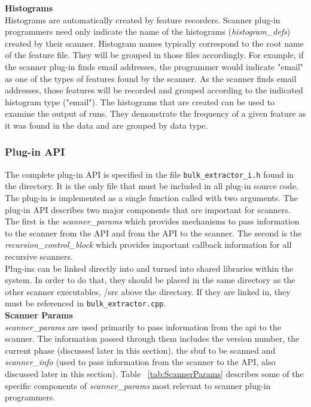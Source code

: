 \documentclass[11pt,fleqn]{article} %
\begin{document}
\textbf{Histograms} \\
Histograms are automatically created by feature recorders. Scanner plug-in programmers need only indicate the name of the histograms (\textit{histogram\_defs}) created by their scanner. Histogram names typically correspond to the root name of the feature file.  They will be grouped in those files accordingly. For example, if the scanner plug-in finds email addresses, the programmer would indicate "email" as one of the types of features found by the scanner. As the scanner finds email addresses, those features will be recorded and grouped according to the indicated histogram type ("email"). The histograms that are created can be used to examine the output of \bulk runs.  They demonstrate the frequency of a given feature as it was found in the data and are grouped by data type. 


\subsubsection{Plug-in API}
The complete plug-in API is specified in the file \texttt{bulk\_extractor\_i.h} found in the \beapi directory. It is the only file that must be included in all plug-in source code. The plug-in is implemented as a single function called with two arguments. The plug-in API describes two major components that are important for scanners. The first is the \textit{scanner\_params} which provides mechanisms to pass information to the scanner from the API and from the API to the scanner. The second is the \textit{recursion\_control\_block} which provides important callback information for all recursive scanners. \\

Plug-ins can be linked directly into \bulk and turned into shared libraries within the \bulk system. In order to do that, they should be placed in the same directory as the other scanner executables, /src above the \beapi directory. If they are linked in, they must be referenced in \texttt{bulk\_extractor.cpp}.\\

\textbf{Scanner Params}\\
\textit{scanner\_params} are used primarily to pass information from the api to the scanner. The information passed through them includes the version number, the current phase (discussed later in this section), the sbuf to be scanned and \textit{scanner\_info} (used to pass information from the scanner to the API, also discussed later in this section). Table ~\ref{tab:ScannerParams} describes some of the specific components of \textit{scanner\_params} most relevant to scanner plug-in programmers. \\
\end{document}
